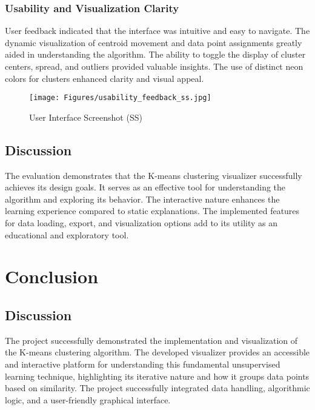 \documentclass[12pt]{report}
\begin{document}
\subsection{Usability and Visualization Clarity}
User feedback indicated that the interface was intuitive and easy to navigate. The dynamic visualization of centroid movement and data point assignments greatly aided in understanding the algorithm. The ability to toggle the display of cluster centers, spread, and outliers provided valuable insights. The use of distinct neon colors for clusters enhanced clarity and visual appeal.
\begin{figure}[h]
        \centering
        \texttt{[image: Figures/usability\_feedback\_ss.jpg]}
        \caption{User Interface Screenshot (SS)}
\end{figure}
\section{Discussion}
The evaluation demonstrates that the K-means clustering visualizer successfully achieves its design goals. It serves as an effective tool for understanding the algorithm and exploring its behavior. The interactive nature enhances the learning experience compared to static explanations. The implemented features for data loading, export, and visualization options add to its utility as an educational and exploratory tool.

\newpage
\chapter{Conclusion}

\section{Discussion}
The project successfully demonstrated the implementation and visualization of the K-means clustering algorithm. The developed visualizer provides an accessible and interactive platform for understanding this fundamental unsupervised learning technique, highlighting its iterative nature and how it groups data points based on similarity. The project successfully integrated data handling, algorithmic logic, and a user-friendly graphical interface.
\end{document}
